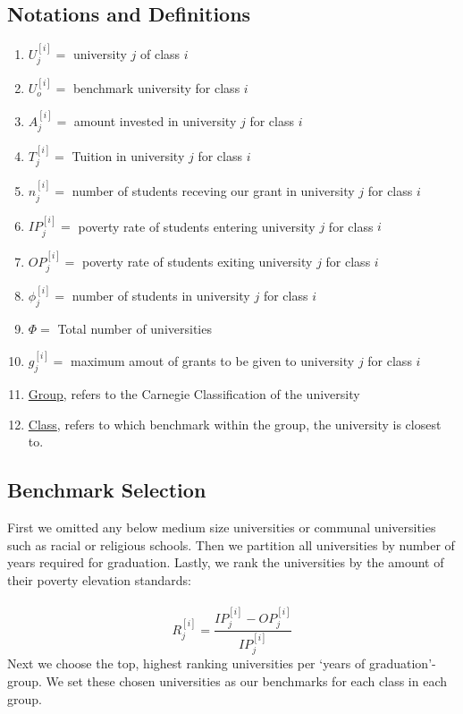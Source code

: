 \documentclass[12pt]{scrartcl}
\begin{document}
	\subsection{Notations and Definitions}
	\begin{enumerate}
		\item $U_j^{[i]} = $ university $j$ of class $i$
		\item $U_o^{[i]} = $ benchmark university for class $i$
		\item $A_j^{[i]} = $ amount invested in university $j$ for class $i$
		\item $T_j^{[i]} = $ Tuition in university $j$ for class $i$
		\item $n_j^{[i]} = $ number of students receving our grant in university $j$ for class $i$
		\item $IP_j^{[i]} = $ poverty rate of students entering university $j$ for class $i$
		\item $OP_j^{[i]} = $ poverty rate of students exiting university $j$ for class $i$
		\item $\phi_j^{[i]} = $ number of students in university $j$ for class $i$
		\item $\Phi = $ Total number of universities
		\item $g_j^{[i]} = $ maximum amout of grants to be given to university $j$ for class $i$
		\item \underline{Group}, refers to the Carnegie Classification of the university
		\item \underline{Class}, refers to which benchmark within the group, the university is closest to.
	\end{enumerate}
	
	\subsection{Benchmark Selection}
	
	First we omitted any below medium size universities or communal universities such as racial or religious schools. Then we partition all universities by number of years required for graduation. Lastly, we rank the universities by the amount of their poverty elevation standards: \\ \\ 
	$$
		R_j^{[i]}=\frac{IP_j^{[i]}-OP_j^{[i]}}{IP_j^{[i]}}
	$$  
	Next we choose the top, highest ranking universities per `years of graduation'-group. We set these chosen universities as our benchmarks for each class in each group.\\
	
\end{document}
